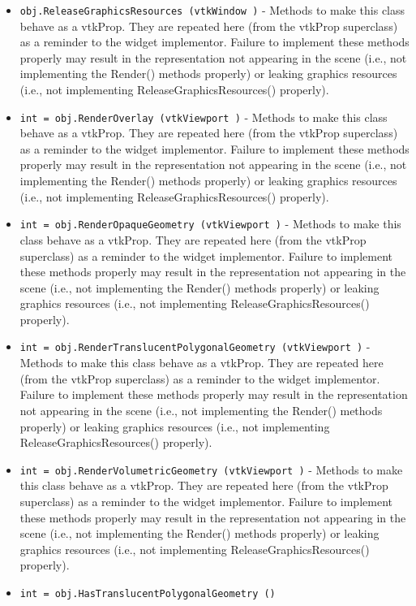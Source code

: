\begin{itemize}
\item  \verb|obj.ReleaseGraphicsResources (vtkWindow )| -  Methods to make this class behave as a vtkProp. They are repeated here (from the
 vtkProp superclass) as a reminder to the widget implementor. Failure to implement
 these methods properly may result in the representation not appearing in the scene
 (i.e., not implementing the Render() methods properly) or leaking graphics resources
 (i.e., not implementing ReleaseGraphicsResources() properly).

\item  \verb|int = obj.RenderOverlay (vtkViewport )| -  Methods to make this class behave as a vtkProp. They are repeated here (from the
 vtkProp superclass) as a reminder to the widget implementor. Failure to implement
 these methods properly may result in the representation not appearing in the scene
 (i.e., not implementing the Render() methods properly) or leaking graphics resources
 (i.e., not implementing ReleaseGraphicsResources() properly).

\item  \verb|int = obj.RenderOpaqueGeometry (vtkViewport )| -  Methods to make this class behave as a vtkProp. They are repeated here (from the
 vtkProp superclass) as a reminder to the widget implementor. Failure to implement
 these methods properly may result in the representation not appearing in the scene
 (i.e., not implementing the Render() methods properly) or leaking graphics resources
 (i.e., not implementing ReleaseGraphicsResources() properly).

\item  \verb|int = obj.RenderTranslucentPolygonalGeometry (vtkViewport )| -  Methods to make this class behave as a vtkProp. They are repeated here (from the
 vtkProp superclass) as a reminder to the widget implementor. Failure to implement
 these methods properly may result in the representation not appearing in the scene
 (i.e., not implementing the Render() methods properly) or leaking graphics resources
 (i.e., not implementing ReleaseGraphicsResources() properly).

\item  \verb|int = obj.RenderVolumetricGeometry (vtkViewport )| -  Methods to make this class behave as a vtkProp. They are repeated here (from the
 vtkProp superclass) as a reminder to the widget implementor. Failure to implement
 these methods properly may result in the representation not appearing in the scene
 (i.e., not implementing the Render() methods properly) or leaking graphics resources
 (i.e., not implementing ReleaseGraphicsResources() properly).

\item  \verb|int = obj.HasTranslucentPolygonalGeometry ()|

\end{itemize}
